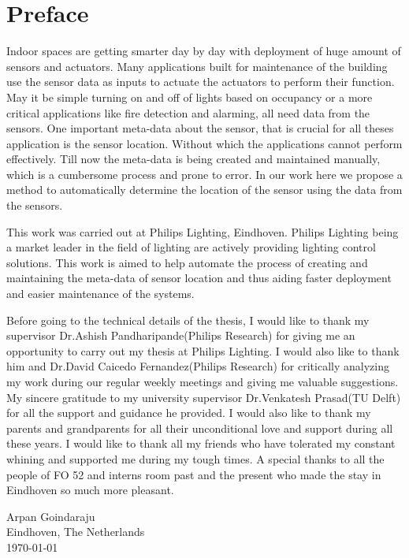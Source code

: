 \chapter*{Preface}


\vspace{1\baselineskip}

\noindent
Indoor spaces are getting smarter day by day with deployment of huge amount of sensors and actuators. Many applications built for maintenance of the building use the sensor data as inputs to actuate the actuators to perform their function. May it be simple turning on and off of lights based on occupancy or a more critical applications like fire detection and alarming, all need data from the sensors. One important meta-data about the sensor, that is crucial for all theses application is the sensor location. Without which the applications cannot perform effectively. Till now the meta-data is being created and maintained manually, which is a cumbersome process and prone to error. In our work here we propose a method to automatically determine the location of the sensor using the data from the sensors.

This work was carried out at Philips Lighting, Eindhoven. Philips Lighting being a market leader in the field of lighting are actively providing lighting control solutions. This work is aimed to help automate the process of creating and maintaining the meta-data of sensor location and thus aiding faster deployment and easier maintenance of the systems.

Before going to the technical details of the thesis, I would like to thank my supervisor Dr.Ashish Pandharipande(Philips Research) for giving me an opportunity to carry out my thesis at Philips Lighting. I would also like to thank him and Dr.David Caicedo Fernandez(Philips Research) for critically analyzing my work during our regular weekly meetings and giving me valuable suggestions. My sincere gratitude to my university supervisor Dr.Venkatesh Prasad(TU Delft) for all the support and guidance he provided. I would also like to thank my parents and grandparents for all their unconditional love and support during all these years.
I would like to thank all my friends who have tolerated my constant whining and supported me during my tough times.
A special thanks to all the people of FO 52 and interns room past and the present who made the stay in Eindhoven so much more pleasant.

\vspace{1\baselineskip}

\noindent
Arpan Goindaraju\\
Eindhoven, The Netherlands\\
\today
